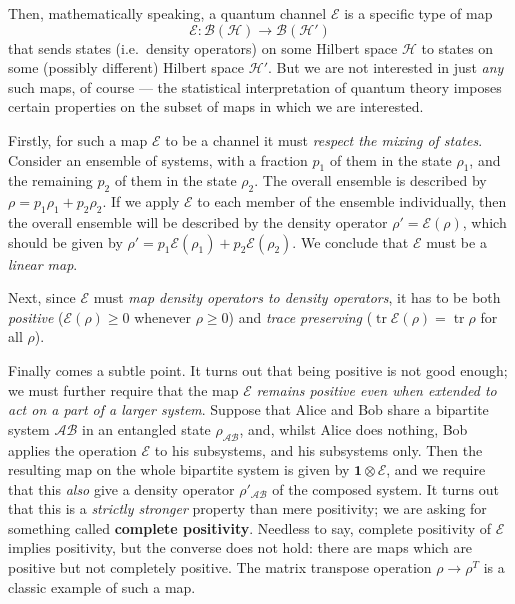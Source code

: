 \documentclass[fleqn,a4paper]{article}
\theoremstyle{definition}
\theoremstyle{definition}
\theoremstyle{definition}
\theoremstyle{definition}
\theoremstyle{remark}
\begin{document}
Then, mathematically speaking, a quantum channel \(\mathcal{E}\) is a specific type of map
\[
  \mathcal{E}\colon \mathcal{B}(\mathcal{H}) \to \mathcal{B}(\mathcal{H}')
\]
that sends states (i.e.~density operators) on some Hilbert space \(\mathcal{H}\) to states on some (possibly different) Hilbert space \(\mathcal{H}'\).
But we are not interested in just \emph{any} such maps, of course --- the statistical interpretation of quantum theory imposes certain properties on the subset of maps in which we are interested.

Firstly, for such a map \(\mathcal{E}\) to be a channel it must \emph{respect the mixing of states}.
Consider an ensemble of systems, with a fraction \(p_1\) of them in the state \(\rho_1\), and the remaining \(p_2\) of them in the state \(\rho_2\).
The overall ensemble is described by \(\rho=p_1\rho_1+p_2\rho_2\).
If we apply \(\mathcal{E}\) to each member of the ensemble individually, then the overall ensemble will be described by the density operator \(\rho'=\mathcal{E}(\rho)\), which should be given by \(\rho'=p_1\mathcal{E}(\rho_1)+p_2\mathcal{E}(\rho_2)\).
We conclude that \(\mathcal{E}\) must be a \emph{linear map}.

Next, since \(\mathcal{E}\) must \emph{map density operators to density operators}, it has to be both \emph{positive} (\(\mathcal{E}(\rho)\geqslant 0\) whenever \(\rho\geqslant 0\)) and \emph{trace preserving} (\(\operatorname{tr}\mathcal{E}(\rho)=\operatorname{tr}\rho\) for all \(\rho\)).

Finally comes a subtle point.
It turns out that being positive is not good enough;
we must further require that the map \(\mathcal{E}\) \emph{remains positive even when extended to act on a part of a larger system}.
Suppose that Alice and Bob share a bipartite system \(\mathcal{AB}\) in an entangled state \(\rho_\mathcal{AB}\), and, whilst Alice does nothing, Bob applies the operation \(\mathcal{E}\) to his subsystems, and his subsystems only.
Then the resulting map on the whole bipartite system is given by \(\mathbf{1}\otimes\mathcal{E}\), and we require that this \emph{also} give a density operator \(\rho'_\mathcal{AB}\) of the composed system.
It turns out that this is a \emph{strictly stronger} property than mere positivity;
we are asking for something called \textbf{complete positivity}.
Needless to say, complete positivity of \(\mathcal{E}\) implies positivity, but the converse does not hold: there are maps which are positive but not completely positive.
The matrix transpose operation \(\rho\rightarrow\rho^T\) is a classic example of such a map.
\end{document}

